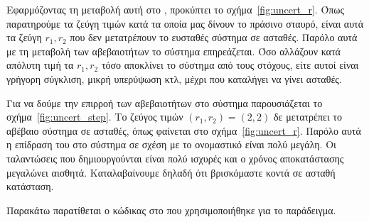 Εφαρμόζοντας τη μεταβολή αυτή στο , προκύπτει το σχήμα~\ref{fig:uncert_r}.
Όπως παρατηρούμε τα ζεύγη τιμών κατά τα οποία μας δίνουν το πράσινο σταυρό,
είναι αυτά τα ζεύγη \( r_1, r_2 \) που δεν μετατρέπουν το ευσταθές σύστημα σε ασταθές.
Παρόλο αυτά με τη μεταβολή των αβεβαιοτήτων το σύστημα επηρεάζεται. Όσο αλλάζουν κατά
απόλυτη τιμή τα \( r_1, r_2 \) τόσο αποκλίνει το σύστημα από τους στόχους, είτε αυτοί είναι
γρήγορη σύγκλιση, μικρή υπερύψωση κτλ, μέχρι που καταλήγει να γίνει ασταθές.

Για να δούμε την επιρροή των αβεβαιοτήτων στο σύστημα παρουσιάζεται το
σχήμα~\ref{fig:uncert_step}. Το ζεύγος τιμών \( (r_1, r_2) = (2, 2) \) δε
μετατρέπει το αβέβαιο σύστημα σε ασταθές, όπως φαίνεται στο
σχήμα~\ref{fig:uncert_r}.
Παρόλο αυτά η επίδραση του στο σύστημα σε σχέση με το ονομαστικό είναι πολύ μεγάλη.
Οι ταλαντώσεις που δημιουργούνται είναι πολύ ισχυρές και ο χρόνος αποκατάστασης
μεγαλώνει αισθητά. Καταλαβαίνουμε δηλαδή ότι βρισκόμαστε κοντά σε ασταθή
κατάσταση.

Παρακάτω παρατίθεται ο κώδικας στο  που χρησιμοποιήθηκε για το
παράδειγμα.
\eng{}
